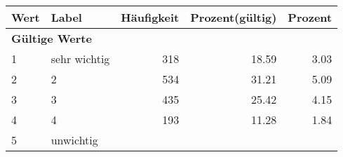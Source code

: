      \begin{longtable}{lXrrr}
     \toprule
     \textbf{Wert} & \textbf{Label} & \textbf{Häufigkeit} & \textbf{Prozent(gültig)} & \textbf{Prozent} \\
     \endhead
     \midrule
     \multicolumn{5}{l}{\textbf{Gültige Werte}}\\

     1 &
     \multicolumn{1}{X}{ sehr wichtig   } &


       \num{318} &
       \num[round-mode=places,round-precision=2]{18,59} &
         \num[round-mode=places,round-precision=2]{3,03} \\

     2 &
     \multicolumn{1}{X}{ 2   } &


       \num{534} &
       \num[round-mode=places,round-precision=2]{31,21} &
         \num[round-mode=places,round-precision=2]{5,09} \\

     3 &
     \multicolumn{1}{X}{ 3   } &


       \num{435} &
       \num[round-mode=places,round-precision=2]{25,42} &
         \num[round-mode=places,round-precision=2]{4,15} \\

     4 &
     \multicolumn{1}{X}{ 4   } &


       \num{193} &
       \num[round-mode=places,round-precision=2]{11,28} &
         \num[round-mode=places,round-precision=2]{1,84} \\

     5 &
     \multicolumn{1}{X}{ unwichtig   } &



\end{longtable}
